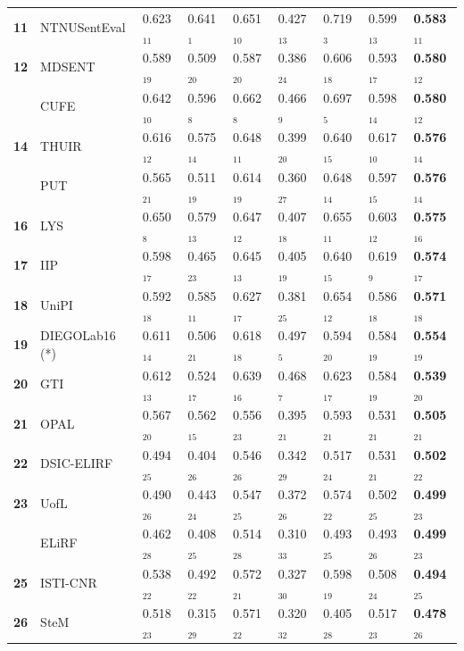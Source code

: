 \documentclass[11pt,letterpaper]{article}
\begin{document}
\begin{table}[thb!]
\begin{small}
{\begin{tabular}{|c|l|ll|lll|l|l|}
      \bf 11 & NTNUSentEval & 0.623$_{11}$ & 0.641$_{1}$ & 0.651$_{10}$ & 0.427$_{13}$ & 0.719$_{3}$ & 0.599$_{13}$ & \bf 0.583$_{11}$ \\
      \bf 12 & MDSENT & 0.589$_{19}$ & 0.509$_{20}$ & 0.587$_{20}$ & 0.386$_{24}$ & 0.606$_{18}$ & 0.593$_{17}$ & \bf 0.580$_{12}$ \\
      & CUFE & 0.642$_{10}$ & 0.596$_{8}$ & 0.662$_{8}$ & 0.466$_{9}$ & 0.697$_{5}$ & 0.598$_{14}$ & \bf 0.580$_{12}$ \\
      \bf 14 & THUIR & 0.616$_{12}$ & 0.575$_{14}$ & 0.648$_{11}$ & 0.399$_{20}$ & 0.640$_{15}$ & 0.617$_{10}$ & \bf 0.576$_{14}$ \\
      & PUT & 0.565$_{21}$ & 0.511$_{19}$ & 0.614$_{19}$ & 0.360$_{27}$ & 0.648$_{14}$ & 0.597$_{15}$ & \bf 0.576$_{14}$ \\
      \bf 16 & LYS & 0.650$_{8}$ & 0.579$_{13}$ & 0.647$_{12}$ & 0.407$_{18}$ & 0.655$_{11}$ & 0.603$_{12}$ & \bf 0.575$_{16}$ \\
      \bf 17 & IIP & 0.598$_{17}$ & 0.465$_{23}$ & 0.645$_{13}$ & 0.405$_{19}$ & 0.640$_{15}$ & 0.619$_{9}$ & \bf 0.574$_{17}$ \\
      \bf 18 & UniPI & 0.592$_{18}$ & 0.585$_{11}$ & 0.627$_{17}$ & 0.381$_{25}$ & 0.654$_{12}$ & 0.586$_{18}$ & \bf 0.571$_{18}$ \\
      \bf 19 & DIEGOLab16 (*) & 0.611$_{14}$ & 0.506$_{21}$ & 0.618$_{18}$ & 0.497$_{5}$ & 0.594$_{20}$ & 0.584$_{19}$ & \bf 0.554$_{19}$ \\
      \bf 20 & GTI & 0.612$_{13}$ & 0.524$_{17}$ & 0.639$_{16}$ & 0.468$_{7}$ & 0.623$_{17}$ & 0.584$_{19}$ & \bf 0.539$_{20}$ \\
      \bf 21 & OPAL & 0.567$_{20}$ & 0.562$_{15}$ & 0.556$_{23}$ & 0.395$_{21}$ & 0.593$_{21}$ & 0.531$_{21}$ & \bf 0.505$_{21}$ \\
      \bf 22 & DSIC-ELIRF & 0.494$_{25}$ & 0.404$_{26}$ & 0.546$_{26}$ & 0.342$_{29}$ & 0.517$_{24}$ & 0.531$_{21}$ & \bf 0.502$_{22}$ \\
      \bf 23 & UofL & 0.490$_{26}$ & 0.443$_{24}$ & 0.547$_{25}$ & 0.372$_{26}$ & 0.574$_{22}$ & 0.502$_{25}$ & \bf 0.499$_{23}$ \\
      & ELiRF & 0.462$_{28}$ & 0.408$_{25}$ & 0.514$_{28}$ & 0.310$_{33}$ & 0.493$_{25}$ & 0.493$_{26}$ & \bf 0.499$_{23}$ \\
      \bf 25 & ISTI-CNR & 0.538$_{22}$ & 0.492$_{22}$ & 0.572$_{21}$ & 0.327$_{30}$ & 0.598$_{19}$ & 0.508$_{24}$ & \bf 0.494$_{25}$ \\
      \bf 26 & SteM & 0.518$_{23}$ & 0.315$_{29}$ & 0.571$_{22}$ & 0.320$_{32}$ & 0.405$_{28}$ & 0.517$_{23}$ & \bf 0.478$_{26}$ \\

\end{tabular}}
\end{small}
\end{table}
\end{document}
